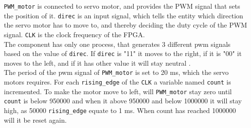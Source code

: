 \texttt{PWM\_motor} is connected to servo motor, and provides the PWM signal that sets the position of it. 
\texttt{direc} is an input signal, which tells the entity which direction the servo motor has to move to, and thereby deciding the duty cycle of the PWM signal. \texttt{CLK} is the clock frequency of the FPGA. \\

The component has only one process, that generates 3 different pwm signals based on the value of \texttt{direc}. If \texttt{direc} is "11" it moves to the right, if it is "00" it moves to the left, and if it has  other value it will stay neutral . \\


The period of the pwm signal of \texttt{PWM\_motor} is set to  20 ms, which the servo motors requires. 
For each  \texttt{rising\_edge} of the \texttt{CLK} a variable named \texttt{count} is incremented.  To make the motor move to left, will \texttt{PWM\_motor} stay zero until \texttt{count} is below 950000 and when it above 950000  and below 1000000 it will stay high, as 50000 \texttt{rising\_edge} equate to 1 ms. When count has reached 1000000 will it be reset again. \\




